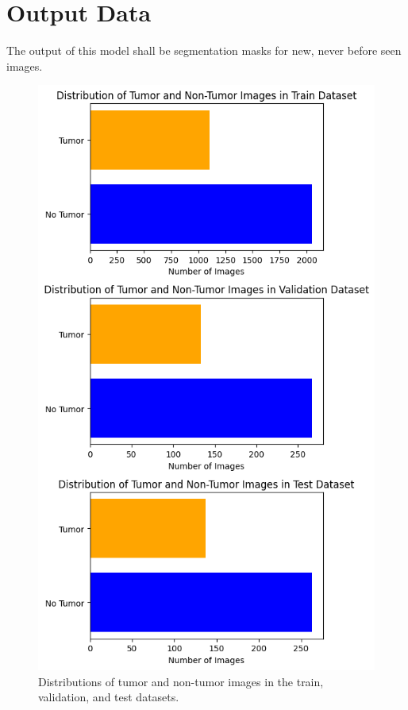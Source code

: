 \documentclass[conference]{IEEEtran}
\begin{document}
\section{Output Data}\label{sec3}
The output of this model shall be segmentation masks for new, never before seen images.
\begin{figure}[!t]
    \centering
    \includegraphics[width=\columnwidth]{imgs/data_stats.png}
    \caption{Distributions of tumor and non-tumor images in the train, validation, and test datasets.}
    \label{fig:datastats}
\end{figure}
\end{document}
